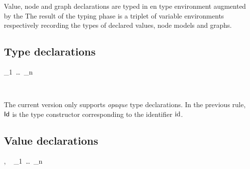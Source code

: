 Value, node and graph declarations are typed in en type environment augmented by the
The result of the typing phase is a triplet of variable environments respectively recording the
types of declared values, node models and graphs.

\subsection{Type declarations}
\label{sec:typing-type-decls}


{\TE \vdash {}_1~\ldots~_n \gives {}}


\infrule[TyDecl]
{}
{\TE~ \vdash {}~ }

The current version only supports \emph{opaque} type declarations. In the previous rule, $\mathsf{Id}$
is the type constructor corresponding to the identifier $\hbox{id}$.


\subsection{Value declarations}
\label{sec:typing-value-decls}


{\TE, \VE~ \vdash {}_1~\ldots~_n }




